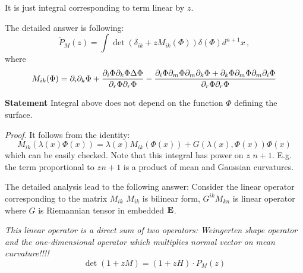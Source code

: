 It is just integral corresponding to term linear by $z$.

  The detailed  answer is following:
            $$
            \tilde P_M(z)=\int \det(\delta_{ik}+zM_{ik}(\Phi))\delta(\Phi)d^{n+1}x\,,
            $$
where
            $$
M_{ik}(\Phi)=\partial_i\partial_k\Phi+{\partial_i\Phi\partial_k\Phi\Delta\Phi\over
\partial_r\Phi\partial_r\Phi}
   -{{\partial_i\Phi\partial_m\Phi\partial_m\partial_k\Phi+\partial_k\Phi\partial_m\Phi\partial_m\partial_i\Phi
   \over \partial_r\Phi\partial_r\Phi}}
            $$

      {\bf Statement} Integral above does not depend on the function $\Phi$
      defining the surface.

      {\it Proof}. It follows from the identity:
                 $$
             M_{ik}\left(\lambda(x)\Phi(x)\right)=\lambda(x)
             M_{ik}(\Phi(x))+G(\lambda(x),\Phi(x))\Phi(x)
                    $$
                    which can be easily checked.
Note that this integral has power on $z$ $n+1$. E.g. the term proportional to $z^{}n+1$
is a product of mean and Gaussian curvatures.

The detailed analysis lead to the following answer:
Consider the linear operator corresponding to the matrix $M_{ik}$
$M_{ik}$ is bilinear form,
$G^{ik}M_{kn}$ is linear operator where $G$ is Riemannian
tensor in embedded ${\bf E}$.
{\it This linear operator is a direct sum of two
operators: Weingerten shape operator and the one-dimensional operator which multiplies
normal vector on mean curvature!!!!
                 $$
           \det (1+zM)=(1+zH)\cdot P_M(z)
                 $$


 }



 \bye
